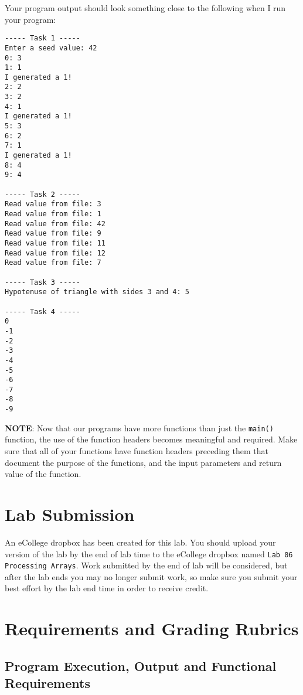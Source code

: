 \documentclass[11pt]{article}
\begin{document}
Your program output should look something close to the following when I
run your program:

\begin{verbatim}
----- Task 1 -----
Enter a seed value: 42
0: 3
1: 1
I generated a 1!
2: 2
3: 2
4: 1
I generated a 1!
5: 3
6: 2
7: 1
I generated a 1!
8: 4
9: 4

----- Task 2 -----
Read value from file: 3
Read value from file: 1
Read value from file: 42
Read value from file: 9
Read value from file: 11
Read value from file: 12
Read value from file: 7

----- Task 3 -----
Hypotenuse of triangle with sides 3 and 4: 5

----- Task 4 -----
0
-1
-2
-3
-4
-5
-6
-7
-8
-9
\end{verbatim}


\textbf{NOTE}: Now that our programs have more functions than just the
\verb~main()~ function, the use of the function headers becomes meaningful
and required.  Make sure that all of your functions have function
headers preceding them that document the purpose of the functions, and
the input parameters and return value of the function.
\section*{Lab Submission}
\label{sec-3}

An eCollege dropbox has been created for this lab.  You should
upload your version of the lab by the end of lab time to the eCollege
dropbox named \verb~Lab 06 Processing Arrays~.  Work submitted by the end
of lab will be considered, but after the lab ends you may no longer
submit work, so make sure you submit your best effort by the lab end
time in order to receive credit.
\section*{Requirements and Grading Rubrics}
\label{sec-4}

\subsection*{Program Execution, Output and Functional Requirements}
\label{sec-4-1}
\end{document}
